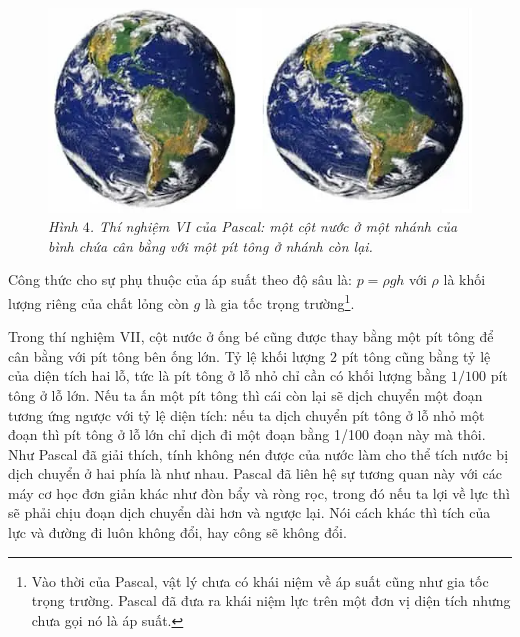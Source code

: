 \begin{multicols}{2}
	\begin{figure}[H]
		\vspace*{-5pt}
		\centering
		\captionsetup{labelformat= empty, justification=centering}
		\includegraphics[width= 1\linewidth]{5}
		\caption{\small\textit{\color{timhieukhoahoc}Hình $4$. Thí nghiệm VI của Pascal: một cột nước ở một nhánh của bình chứa cân bằng với một pít tông ở nhánh còn lại.}}
		\vspace*{-10pt}
	\end{figure}
	\begin{Tbox}
		Công thức cho sự phụ thuộc của áp suất theo độ sâu là: $p=\rho gh$ với $\rho$ là khối lượng riêng của chất lỏng còn $g$ là gia tốc trọng trường\footnote[2]{\color{timhieukhoahoc}Vào thời của Pascal, vật lý chưa có khái niệm về áp suất cũng như gia tốc trọng trường. Pascal đã đưa ra khái niệm lực trên một đơn vị diện tích nhưng chưa gọi nó là áp suất.}. 
	\end{Tbox}
	Trong thí nghiệm VII, cột nước ở ống bé cũng được thay bằng một pít tông để cân bằng với pít tông bên ống lớn. Tỷ lệ khối lượng $2$ pít tông cũng bằng tỷ lệ của diện tích hai lỗ, tức là pít tông ở lỗ nhỏ chỉ cần có khối lượng bằng $1/100$ pít tông ở lỗ lớn. Nếu ta ấn một pít tông thì cái còn lại sẽ dịch chuyển một đoạn tương ứng ngược với tỷ lệ diện tích: nếu ta dịch chuyển pít tông ở lỗ nhỏ một đoạn thì pít tông ở lỗ lớn chỉ dịch đi một đoạn bằng 1/100 đoạn này mà thôi. Như Pascal đã giải thích, tính không nén được của nước làm cho thể tích nước bị dịch chuyển ở hai phía là như nhau. Pascal đã liên hệ sự tương quan này với các máy cơ học đơn giản khác như đòn bẩy và ròng rọc, trong đó nếu ta lợi về lực thì sẽ phải chịu đoạn dịch chuyển dài hơn và ngược lại. Nói cách khác thì tích của lực và đường đi luôn không đổi, hay công sẽ không đổi.
	\begin{figure}[H]
		\vspace*{-5pt}
		\centering
		\captionsetup{labelformat= empty, justification=centering}

\end{figure}
\end{multicols}
